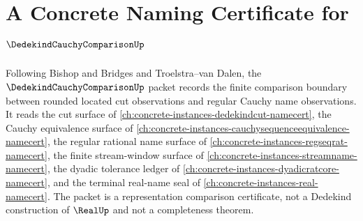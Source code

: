 \chapter{A Concrete Naming Certificate for $\DedekindCauchyComparisonUp$}
\label{ch:concrete-instances-dedekind-cauchy-comparison-namecert}

Following Bishop and Bridges and Troelstra--van Dalen, the $\DedekindCauchyComparisonUp$ packet records the finite comparison boundary between rounded located cut observations and regular Cauchy name observations. It reads the cut surface of \autoref{ch:concrete-instances-dedekindcut-namecert}, the Cauchy equivalence surface of \autoref{ch:concrete-instances-cauchysequenceequivalence-namecert}, the regular rational name surface of \autoref{ch:concrete-instances-regseqrat-namecert}, the finite stream-window surface of \autoref{ch:concrete-instances-streamname-namecert}, the dyadic tolerance ledger of \autoref{ch:concrete-instances-dyadicratcore-namecert}, and the terminal real-name seal of \autoref{ch:concrete-instances-real-namecert}. The packet is a representation comparison certificate, not a Dedekind construction of $\RealUp$ and not a completeness theorem.

